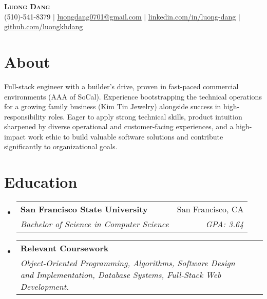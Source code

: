 \documentclass[letterpaper,10pt]{article}
\makeatletter
\newcommand{\resumeSubheading}[4]{
  \vspace{-2pt}\item %
  \begin{tabular*}{0.97\textwidth}[t]{l@{\extracolsep{\fill}}r}
    \textbf{#1} & #2 \\
    \textit{\small#3} & \textit{\small #4} \\
  \end{tabular*}\vspace{-6pt} %
}
\newcommand{\resumeSubHeadingListStart}{\begin{itemize}[leftmargin=0.15in, label={}]}
\newcommand{\resumeSubHeadingListEnd}{\end{itemize}}
\makeatother
\begin{document}
\begin{center}
    \textbf{\Huge \scshape Luong Dang} \\ \vspace{1pt} %
    \small %
    (510)-541-8379 $|$
    \href{mailto:luongdang0701@gmail.com}{\underline{luongdang0701@gmail.com}} $|$
    \href{https://linkedin.com/in/luong-dang}{\underline{linkedin.com/in/luong-dang}} $|$
    \href{https://github.com/luongkhdang}{\underline{github.com/luongkhdang}}
\end{center}

\section{About} 
\small{\justifying %
Full-stack engineer with a builder's drive, proven in fast-paced commercial environments (AAA of SoCal). Experience bootstrapping the technical operations for a growing family business (Kim Tin Jewelry) alongside success in high-responsibility roles. Eager to apply strong technical skills, product intuition sharpened by diverse operational and customer-facing experiences, and a high-impact work ethic to build valuable software solutions and contribute significantly to organizational goals.
} %

\section{Education}
\resumeSubHeadingListStart
    \resumeSubheading
      {San Francisco State University}{San Francisco, CA}
      {Bachelor of Science in Computer Science}{GPA: 3.64} %
    \vspace{1pt} %
    \resumeSubheading %
      {Relevant Coursework}{} %
      {Object-Oriented Programming, Algorithms, Software Design and Implementation, Database Systems, Full-Stack Web Development.}{} %
\resumeSubHeadingListEnd
\end{document}
